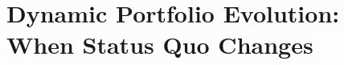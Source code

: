 %
%
%
%

\chapter{Dynamic Portfolio Evolution: When Status Quo Changes}
\label{ch:dynamic-portfolio-evolution}

